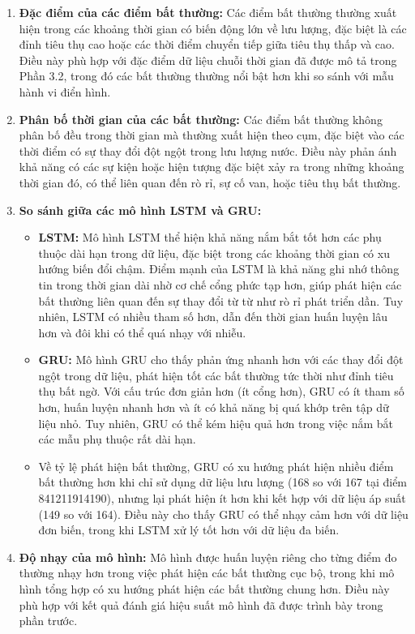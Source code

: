 \begin{enumerate}
    \item \textbf{Đặc điểm của các điểm bất thường:} Các điểm bất thường thường xuất hiện trong các khoảng thời gian có biến động lớn về lưu lượng, đặc biệt là các đỉnh tiêu thụ cao hoặc các thời điểm chuyển tiếp giữa tiêu thụ thấp và cao. Điều này phù hợp với đặc điểm dữ liệu chuỗi thời gian đã được mô tả trong Phần 3.2, trong đó các bất thường thường nổi bật hơn khi so sánh với mẫu hành vi điển hình.
    
    \item \textbf{Phân bố thời gian của các bất thường:} Các điểm bất thường không phân bố đều trong thời gian mà thường xuất hiện theo cụm, đặc biệt vào các thời điểm có sự thay đổi đột ngột trong lưu lượng nước. Điều này phản ánh khả năng có các sự kiện hoặc hiện tượng đặc biệt xảy ra trong những khoảng thời gian đó, có thể liên quan đến rò rỉ, sự cố van, hoặc tiêu thụ bất thường.
    
    \item \textbf{So sánh giữa các mô hình LSTM và GRU:} 
    \begin{itemize}
        \item \textbf{LSTM:} Mô hình LSTM thể hiện khả năng nắm bắt tốt hơn các phụ thuộc dài hạn trong dữ liệu, đặc biệt trong các khoảng thời gian có xu hướng biến đổi chậm. Điểm mạnh của LSTM là khả năng ghi nhớ thông tin trong thời gian dài nhờ cơ chế cổng phức tạp hơn, giúp phát hiện các bất thường liên quan đến sự thay đổi từ từ như rò rỉ phát triển dần. Tuy nhiên, LSTM có nhiều tham số hơn, dẫn đến thời gian huấn luyện lâu hơn và đôi khi có thể quá nhạy với nhiễu.
        
        \item \textbf{GRU:} Mô hình GRU cho thấy phản ứng nhanh hơn với các thay đổi đột ngột trong dữ liệu, phát hiện tốt các bất thường tức thời như đỉnh tiêu thụ bất ngờ. Với cấu trúc đơn giản hơn (ít cổng hơn), GRU có ít tham số hơn, huấn luyện nhanh hơn và ít có khả năng bị quá khớp trên tập dữ liệu nhỏ. Tuy nhiên, GRU có thể kém hiệu quả hơn trong việc nắm bắt các mẫu phụ thuộc rất dài hạn.
        
        \item Về tỷ lệ phát hiện bất thường, GRU có xu hướng phát hiện nhiều điểm bất thường hơn khi chỉ sử dụng dữ liệu lưu lượng (168 so với 167 tại điểm 841211914190), nhưng lại phát hiện ít hơn khi kết hợp với dữ liệu áp suất (149 so với 164). Điều này cho thấy GRU có thể nhạy cảm hơn với dữ liệu đơn biến, trong khi LSTM xử lý tốt hơn với dữ liệu đa biến.
    \end{itemize}
    
    \item \textbf{Độ nhạy của mô hình:} Mô hình được huấn luyện riêng cho từng điểm đo thường nhạy hơn trong việc phát hiện các bất thường cục bộ, trong khi mô hình tổng hợp có xu hướng phát hiện các bất thường chung hơn. Điều này phù hợp với kết quả đánh giá hiệu suất mô hình đã được trình bày trong phần trước.
    
\end{enumerate}

